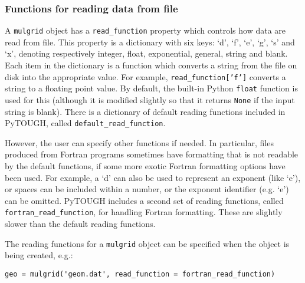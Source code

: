\subsubsection{Functions for reading data from file}

A \texttt{mulgrid} object has a \texttt{read\_function} property which controls how data are read from file.  This property is a dictionary with six keys: `d', `f', `e', `g', `s' and `x', denoting respectively integer, float, exponential, general, string and blank.  Each item in the dictionary is a function which converts a string from the file on disk into the appropriate value.  For example, \texttt{read\_function['f']} converts a string to a floating point value.  By default, the built-in Python \texttt{float} function is used for this (although it is modified slightly so that it returns \texttt{None} if the input string is blank).  There is a dictionary of default reading functions included in PyTOUGH, called \texttt{default\_read\_function}.

However, the user can specify other functions if needed.  In particular, files produced from Fortran programs sometimes have formatting that is not readable by the default functions, if some more exotic Fortran formatting options have been used.   For example, a `d' can also be used to represent an exponent (like `e'), or spaces can be included within a number, or the exponent identifier (e.g. `e') can be omitted.  PyTOUGH includes a second set of reading functions, called \texttt{fortran\_read\_function}, for handling Fortran formatting.  These are slightly slower than the default reading functions.

The reading functions for a \texttt{mulgrid} object can be specified when the object is being created, e.g.:

\begin{lstlisting}
geo = mulgrid('geom.dat', read_function = fortran_read_function)
\end{lstlisting}

